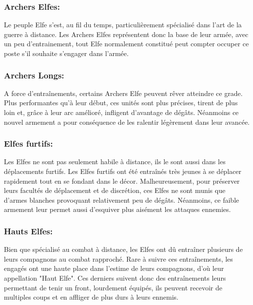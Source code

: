\documentclass[a4paper]{article}
\begin{document}
 	\subsubsection{Archers Elfes: }
 	
 	\quad Le peuple Elfe s'est, au fil du temps, particulièrement spécialisé dans l'art de la guerre à distance. Les Archers Elfes représentent donc la base de leur armée, avec un peu d'entrainement, tout Elfe normalement constitué peut compter occuper ce poste s'il souhaite s'engager dans l'armée.
 	
 	\subsubsection{Archers Longs: }
 	
 	\quad A force d’entraînements, certains Archers Elfe peuvent rêver atteindre ce grade. Plus performantes qu'à leur début, ces unités sont plus précises, tirent de plus loin et, grâce à leur arc amélioré, infligent d'avantage de dégâts. Néanmoins ce nouvel armement a pour conséquence de les ralentir légèrement dans leur avancée.
 	
 	\subsubsection{Elfes furtifs: }
 	
 	\quad Les Elfes ne sont pas seulement habile à distance, ils le sont aussi dans les déplacements furtifs. Les Elfes furtifs ont été entraînés très jeunes à se déplacer rapidement tout en se fondant dans le décor. Malheureusement, pour préserver leurs facultés de déplacement et de discrétion, ces Elfes ne sont munis que d'armes blanches provoquant relativement peu de dégâts. Néanmoins, ce faible armement leur permet aussi d'esquiver plus aisément les attaques ennemies.
 	
 	\subsubsection{Hauts Elfes: }
 	
 	\quad Bien que spécialisé au combat à distance, les Elfes ont dû entraîner plusieurs de leurs compagnons au combat rapproché. Rare à suivre ces entraînements, les engagés ont une haute place dans l'estime de leurs compagnons, d'où leur appellation "Haut Elfe". Ces derniers suivent donc des entraînements leurs permettant de tenir un front, lourdement équipés, ils peuvent recevoir de multiples coups et en affliger de plus durs à leurs ennemis.
 	
\end{document}
